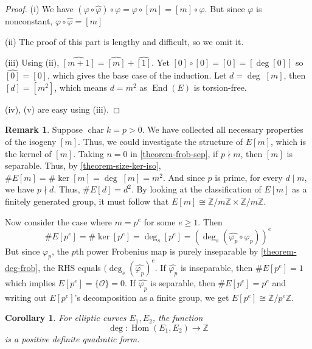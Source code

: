 \documentclass[12pt]{article}
\newtheorem{corollary}{Corollary}[subsection]
\theoremstyle{remark}
\theoremstyle{definition}
\newtheorem{remark}{Remark}[subsection]
\newcommand{\Z}[0]{\mathbb{Z}}
\newcommand{\ecO}[0]{\mathcal O}
\newcommand{\Hom}[0]{\operatorname{Hom}}
\newcommand{\End}[0]{\operatorname{End}}
\begin{document}
    \begin{proof}
        (i) We have $(\varphi\circ\hat\varphi)\circ\varphi=\varphi\circ[m]=[m]\circ\varphi$. But since $\varphi$ is nonconstant, $\varphi\circ\hat\varphi=[m]$
        
        (ii) The proof of this part is lengthy and difficult, so we omit it.
        
        (iii) Using (ii), $\widehat{[m+1]}=\widehat{[m]}+\widehat{[1]}$. Yet $[0]\circ[0]=[0]=[\deg[0]]$ so $\widehat{[0]}=[0]$, which gives the base case of the induction. Let $d=\deg\;[m]$, then $[d]=[m^2]$, which means $d=m^2$ as $\End(E)$ is torsion-free.
        
        (iv), (v) are easy using (iii).
    \end{proof}
    \begin{remark}\label{remark-torsion-struct}
        Suppose $\operatorname{char} k=p>0$. We have collected all necessary properties of the isogeny $[m]$. Thus, we could investigate the structure of $E[m]$, which is the kernel of $[m]$. Taking $n=0$ in \autoref{theorem-frob-sep}, if $p\nmid m$, then $[m]$ is separable. Thus, by \autoref{theorem-size-ker-iso}, $\# E[m]=\#\ker[m]=\deg\;[m]=m^2$. And since $p$ is prime, for every $d\mid m$, we have $p\nmid d$. Thus, $\# E[d]=d^2$. By looking at the classification of $E[m]$ as a finitely generated group, it must follow that $E[m]\cong\Z/m\Z\times\Z/m\Z$.
        
        Now consider the case where $m=p^e$ for some $e\geqslant 1$. Then 
        \[\# E[p^e]=\#\ker [p^e]=\deg_s[p^e]=\left(\deg_s(\hat{\varphi_p}\circ\varphi_p)\right)^e\]
        But since $\varphi_p$, the $p$th power Frobenius map is purely inseparable by \autoref{theorem-deg-frob}, the RHS equals $(\deg_s(\hat{\varphi_p})^e$. If $\hat{\varphi_p}$ is inseparable, then $\# E[p^e]=1$ which implies $E[p^e]=\{\ecO\}=0$. If $\hat{\varphi_p}$ is separable, then $\# E[p^e]=p^e$ and writing out $E[p^e]$'s decomposition as a finite group, we get $E[p^e]\cong \Z/p^e\Z$.
    \end{remark}
    \begin{corollary}\label{corollary-deg-pos-quadratic}
        For elliptic curves $E_1, E_2$, the function
        \[\deg:\Hom(E_1,E_2)\to\Z\]
        is a positive definite quadratic form.
    \end{corollary}
\end{document}
